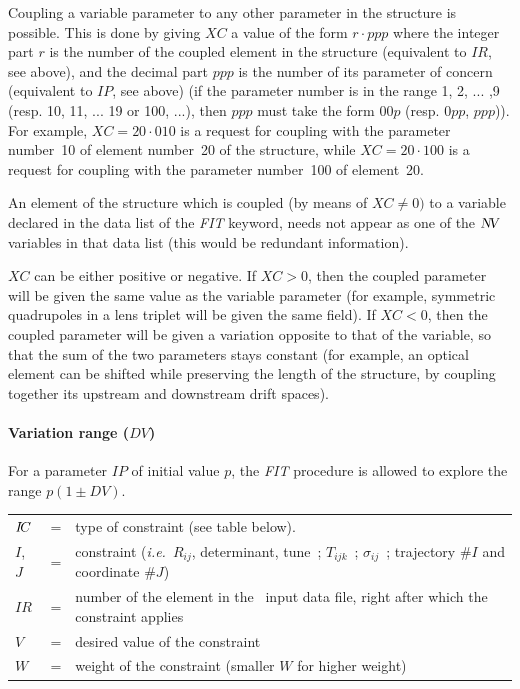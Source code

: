 \noindent  Coupling a variable parameter to any other parameter in the
structure is possible. This is done by giving $XC$ a value of the form $ r \cdot ppp $ where
the integer part $ r $ is the number of the coupled element in the structure 
(equivalent to $ IR$, see above), and the decimal part $ ppp $ is the number of its 
parameter of concern (equivalent to $ IP$,  see above) (if the parameter
number is in the range 1, 2, ... ,9 (resp. 10, 11, ... 19 or 100, ...), then $ ppp $ 
must take the form $ 00p$ (resp. $0pp$, $ppp$)). For example, $ XC=20 \cdot 010 $ is a request for coupling with the
parameter number~10 of element number~20 of the structure, while $ XC=20 \cdot 100 $
is a request for coupling with the parameter number~100 of element~20.  

\bigskip

\noindent An element of the structure which is coupled (by means of $ XC\not= 0) $ to a 
variable declared in the data list of the \textsl{FIT} keyword, needs not appear 
as one of the $ \textsl{N\!V } $ variables in that data list (this would be redundant information).  

\smallskip

\noindent$ XC $ can be either positive or negative. If $ XC>0$,  then the
coupled parameter will be given the same value as the variable parameter  
(for example, symmetric 
quadrupoles in a lens triplet will be given the same field). If $ XC<0$, 
then the coupled parameter will be given a variation opposite to that of the
variable, so that the sum of the two parameters stays constant (for example, an optical 
element can be shifted while preserving the length of the structure, by coupling 
together its upstream and downstream drift spaces).  


\smallskip
 
\paragraph{Variation range  ($DV$)} 

\noindent For a parameter $ IP $ of initial value $ p $, the \textsl{FIT} procedure is
allowed to explore the range $ p(1\pm DV)$.   

\smallskip

\begin{center}
	\begin{tabular}{lcp{10cm}}
	$I\!C$        &  = &  type of  constraint (see table below).\\
	$I$, $J$    & =  &  constraint (\emph{i.e.}~$R_{ij}$, determinant, tune~; 
	                    $T_{ijk}$~; $\sigma_{ ij}$~; trajectory $\#I$ and coordinate $\#J$)\\
	$IR$       &  =  &  number of the element in the \zgou\ input data file, right after which 
	                    the constraint applies   \\
	$V$        &  =  &  desired value of the constraint\\
	$W$        &  =  &  weight of the constraint (smaller $W$ for higher weight)
	\end{tabular}
\end{center}



